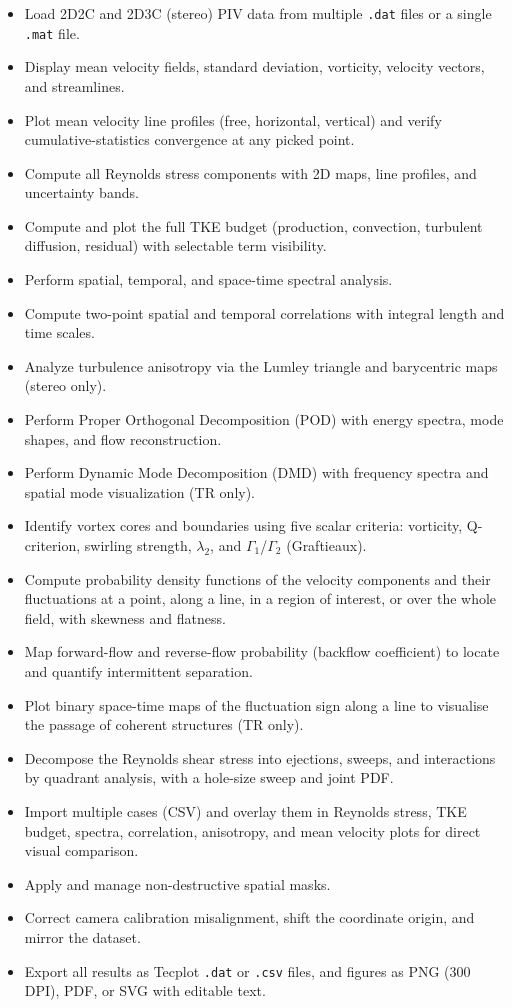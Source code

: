 \begin{itemize}[leftmargin=1.5em]
  \item Load 2D2C and 2D3C (stereo) PIV data from multiple \texttt{.dat} files or a single \texttt{.mat} file.
  \item Display mean velocity fields, standard deviation, vorticity, velocity vectors, and streamlines.
  \item Plot mean velocity line profiles (free, horizontal, vertical) and verify cumulative-statistics convergence at any picked point.
  \item Compute all Reynolds stress components with 2D maps, line profiles, and uncertainty bands.
  \item Compute and plot the full TKE budget (production, convection, turbulent diffusion, residual) with selectable term visibility.
  \item Perform spatial, temporal, and space-time spectral analysis.
  \item Compute two-point spatial and temporal correlations with integral length and time scales.
  \item Analyze turbulence anisotropy via the Lumley triangle and barycentric maps (stereo only).
  \item Perform Proper Orthogonal Decomposition (POD) with energy spectra, mode shapes, and flow reconstruction.
  \item Perform Dynamic Mode Decomposition (DMD) with frequency spectra and spatial mode visualization (TR only).
  \item Identify vortex cores and boundaries using five scalar criteria: vorticity, Q-criterion, swirling strength, $\lambda_2$, and $\Gamma_1$/$\Gamma_2$ (Graftieaux).
  \item Compute probability density functions of the velocity components and their fluctuations at a point, along a line, in a region of interest, or over the whole field, with skewness and flatness.
  \item Map forward-flow and reverse-flow probability (backflow coefficient) to locate and quantify intermittent separation.
  \item Plot binary space-time maps of the fluctuation sign along a line to visualise the passage of coherent structures (TR only).
  \item Decompose the Reynolds shear stress into ejections, sweeps, and interactions by quadrant analysis, with a hole-size sweep and joint PDF.
  \item Import multiple cases (CSV) and overlay them in Reynolds stress, TKE budget, spectra, correlation, anisotropy, and mean velocity plots for direct visual comparison.
  \item Apply and manage non-destructive spatial masks.
  \item Correct camera calibration misalignment, shift the coordinate origin, and mirror the dataset.
  \item Export all results as Tecplot \texttt{.dat} or \texttt{.csv} files, and figures as PNG (300 DPI), PDF, or SVG with editable text.
\end{itemize}

